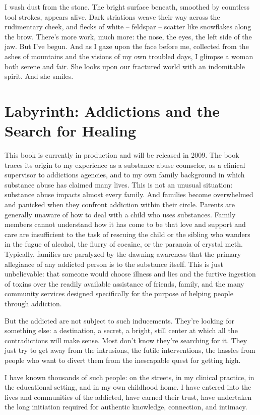 \documentclass[10pt,DIV09,letterpaper,oneside,headsepline]{scrreprt}
\begin{document}
I wash dust from the stone. The bright surface beneath, smoothed by countless tool strokes, appears alive. Dark striations weave their way across the rudimentary cheek, and flecks of white -- feldspar -- scatter like snowflakes along the brow. There's more work, much more: the nose, the eyes, the left side of the jaw. But I've begun. And as I gaze upon the face before me, collected from the ashes of mountains and the visions of my own troubled days, I glimpse a woman both serene and fair. She looks upon our fractured world with an indomitable spirit. And she smiles.

\clearpage

\section{Labyrinth: Addictions and the Search for Healing}

This book is currently in production and will be released in 2009. The book traces its origin to my experience as a substance abuse counselor, as a clinical supervisor to addictions agencies, and to my own family background in which substance abuse has claimed many lives. This is not an unusual situation: substance abuse impacts almost every family. And families become overwhelmed and panicked when they confront addiction within their circle. Parents are generally unaware of how to deal with a child who uses substances. Family members cannot understand how it has come to be that love and support and care are insufficient to the task of rescuing the child or the sibling who wanders in the fugue of alcohol, the flurry of cocaine, or the paranoia of crystal meth. Typically, families are paralyzed by the dawning awareness that the primary allegiance of any addicted person is to the substance itself. This is just unbelievable: that someone would choose illness and lies and the furtive ingestion of toxins over the readily available assistance of friends, family, and the many community services designed specifically for the purpose of helping people through addiction.

But the addicted are not subject to such inducements. They're looking for something else: a destination, a secret, a bright, still center at which all the contradictions will make sense. Most don't know they're searching for it. They just try to get away from the intrusions, the futile interventions, the hassles from people who want to divert them from the inescapable quest for getting high. 

I have known thousands of such people: on the streets, in my clinical practice, in the educational setting, and in my own childhood home. I have entered into the lives and communities of the addicted, have earned their trust, have undertaken the long initiation required for authentic knowledge, connection, and intimacy.
\end{document}
